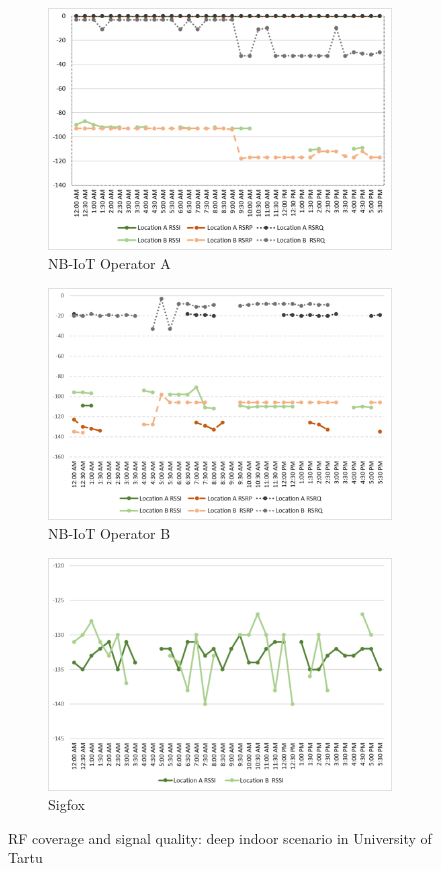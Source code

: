 \documentclass[conference,a4paper,xcolor=table]{IEEEtran}
\begin{document}
 \begin{figure}[t]
\begin{subfigure}[t]{\linewidth}
  \centering
  \includegraphics[width=.7\linewidth]{images/tartu/ATartuDeepIndoor.pdf}  
  \caption{NB-IoT Operator A}
\end{subfigure}
\begin{subfigure}[t]{\linewidth}
  \centering
  \includegraphics[width=.7\linewidth]{images/tartu/BTartuDeepIndoor.pdf}  
  \caption{NB-IoT Operator B}
  
\end{subfigure}
\begin{subfigure}[t]{\linewidth}
  \centering
  \includegraphics[width=.7\linewidth]{images/tartu/STartuDeepIndoor.pdf}  
\caption{Sigfox}
 \end{subfigure}
\caption{RF coverage and signal quality: deep indoor scenario in University of Tartu}
 \label{RFDeepIndoorTartu}
\end{figure}
\end{document}
